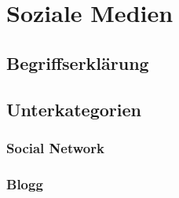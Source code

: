 %
%

\chapter{Soziale Medien}\label{chap.sm}
\section{Begriffserklärung}\label{sec.begriff}
\section{Unterkategorien}\label{sec.unterkat}
\subsection{Social Network}\label{subsec.sn}
\subsection{Blogg}\label{subsec.blogg}

